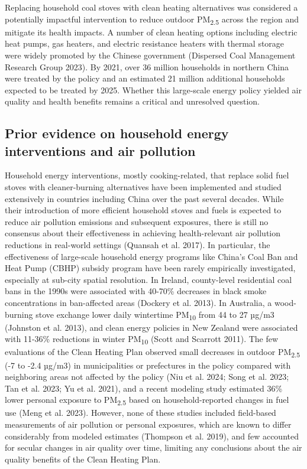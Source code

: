 \documentclass[
  letterpaper,
  DIV=11,
  numbers=noendperiod]{scrartcl}
\begin{document}
Replacing household coal stoves with clean heating alternatives was
considered a potentially impactful intervention to reduce outdoor
PM\textsubscript{2.5} across the region and mitigate its health impacts.
A number of clean heating options including electric heat pumps, gas
heaters, and electric resistance heaters with thermal storage were
widely promoted by the Chinese government (Dispersed Coal Management
Research Group 2023). By 2021, over 36 million households in northern
China were treated by the policy and an estimated 21 million additional
households expected to be treated by 2025. Whether this large-scale
energy policy yielded air quality and health benefits remains a critical
and unresolved question.

\hypertarget{prior-evidence-on-household-energy-interventions-and-air-pollution}{%
\subsection{Prior evidence on household energy interventions and air
pollution}\label{prior-evidence-on-household-energy-interventions-and-air-pollution}}

Household energy interventions, mostly cooking-related, that replace
solid fuel stoves with cleaner-burning alternatives have been
implemented and studied extensively in countries including China over
the past several decades. While their introduction of more efficient
household stoves and fuels is expected to reduce air pollution emissions
and subsequent exposures, there is still no consensus about their
effectiveness in achieving health-relevant air pollution reductions in
real-world settings (Quansah et al. 2017). In particular, the
effectiveness of large-scale household energy programs like China's Coal
Ban and Heat Pump (CBHP) subsidy program have been rarely empirically
investigated, especially at sub-city spatial resolution. In Ireland,
county-level residential coal bans in the 1990s were associated with
40-70\% decreases in black smoke concentrations in ban-affected areas
(Dockery et al. 2013). In Australia, a wood-burning stove exchange lower
daily wintertime PM\textsubscript{10} from 44 to 27 µg/m3 (Johnston et
al. 2013), and clean energy policies in New Zealand were associated with
11-36\% reductions in winter PM\textsubscript{10} (Scott and Scarrott
2011). The few evaluations of the Clean Heating Plan observed small
decreases in outdoor PM\textsubscript{2.5} (-7 to -2.4 µg/m3) in
municipalities or prefectures in the policy compared with neighboring
areas not affected by the policy (Niu et al. 2024; Song et al. 2023; Tan
et al. 2023; Yu et al. 2021), and a recent modeling study estimated 36\%
lower personal exposure to PM\textsubscript{2.5} based on
household-reported changes in fuel use (Meng et al. 2023). However, none
of these studies included field-based measurements of air pollution or
personal exposures, which are known to differ considerably from modeled
estimates (Thompson et al. 2019), and few accounted for secular changes
in air quality over time, limiting any conclusions about the air quality
benefits of the Clean Heating Plan.
\end{document}
